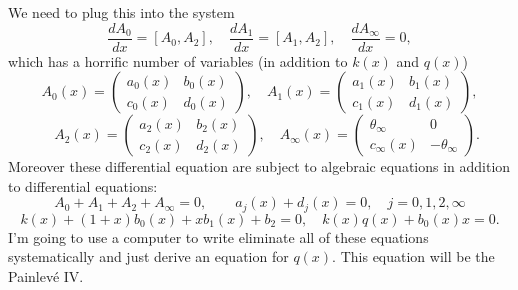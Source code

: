 \documentclass[12pt]{book}
\numberwithin{equation}{section}
\theoremstyle{definition}
\theoremstyle{remark}
\begin{document}
We need to plug this into the system 
$$ \dfrac{dA_0}{dx} = [A_0,A_2], \quad \dfrac{dA_1}{dx} = [A_1,A_2], \quad \dfrac{dA_{\infty}}{dx}=0,$$ 
which has a horrific number of variables (in addition to $k(x)$ and $q(x)$)
$$ A_0(x) = \begin{pmatrix}
a_0(x) & b_0(x) \\
c_0(x) & d_0(x)
\end{pmatrix}, \quad A_1(x) = \begin{pmatrix}
a_1(x) & b_1(x) \\
c_1(x) & d_1(x)
\end{pmatrix}, $$
$$\quad A_2(x) = \begin{pmatrix}
a_2(x) & b_2(x) \\
c_2(x) & d_2(x)
\end{pmatrix},
\quad A_{\infty}(x) = \begin{pmatrix}
\theta_{\infty} & 0\\
c_{\infty}(x) & -\theta_{\infty}
\end{pmatrix}.$$
Moreover these differential equation are subject to algebraic equations in addition to differential equations:
$$ A_0+A_1+A_2+A_{\infty}=0, \qquad a_j(x) + d_j(x)=0, \quad j=0,1,2,\infty$$
$$k(x) +(1 +x)b_0(x) + xb_1(x) + b_2=0, \quad k(x)q(x) + b_0(x)x=0.$$
I'm going to use a computer to write eliminate all of these equations systematically and just derive an equation for $q(x)$. 
This equation will be the Painlev\'e IV. 
\end{document}
